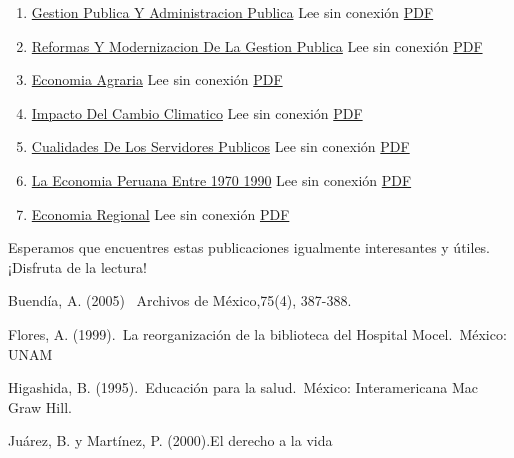 \documentclass[
  jou,
  floatsintext,
  longtable,
  a4paper,
  nolmodern,
  notxfonts,
  notimes,
  colorlinks=true,linkcolor=blue,citecolor=blue,urlcolor=blue]{apa7}
\begin{document}
\begin{enumerate}
{  De Blogdown} Lee sin conexión
  \href{https://achalmaedison.netlify.app/blog/posts/2021-07-14-comandos-de-blogdown/index.pdf}{PDF}
\item
  \href{https://achalmaedison.netlify.app/blog/posts/2021-10-01-gestion-publica-y-administracion-publica}{Gestion
  Publica Y Administracion Publica} Lee sin conexión
  \href{https://achalmaedison.netlify.app/blog/posts/2021-10-01-gestion-publica-y-administracion-publica/index.pdf}{PDF}
\item
  \href{https://achalmaedison.netlify.app/blog/posts/2021-10-01-reformas-y-modernizacion-de-la-gestion-publica}{Reformas
  Y Modernizacion De La Gestion Publica} Lee sin conexión
  \href{https://achalmaedison.netlify.app/blog/posts/2021-10-01-reformas-y-modernizacion-de-la-gestion-publica/index.pdf}{PDF}
\item
  \href{https://achalmaedison.netlify.app/blog/posts/2022-04-22-economia-agraria}{Economia
  Agraria} Lee sin conexión
  \href{https://achalmaedison.netlify.app/blog/posts/2022-04-22-economia-agraria/index.pdf}{PDF}
\item
  \href{https://achalmaedison.netlify.app/blog/posts/2022-06-02-impacto-del-cambio-climatico}{Impacto
  Del Cambio Climatico} Lee sin conexión
  \href{https://achalmaedison.netlify.app/blog/posts/2022-06-02-impacto-del-cambio-climatico/index.pdf}{PDF}
\item
  \href{https://achalmaedison.netlify.app/blog/posts/2023-05-11-cualidades-de-los-servidores-publicos}{Cualidades
  De Los Servidores Publicos} Lee sin conexión
  \href{https://achalmaedison.netlify.app/blog/posts/2023-05-11-cualidades-de-los-servidores-publicos/index.pdf}{PDF}
\item
  \href{https://achalmaedison.netlify.app/blog/posts/2023-05-12-la-economia-peruana-entre-1970-1990}{La
  Economia Peruana Entre 1970 1990} Lee sin conexión
  \href{https://achalmaedison.netlify.app/blog/posts/2023-05-12-la-economia-peruana-entre-1970-1990/index.pdf}{PDF}
\item
  \href{https://achalmaedison.netlify.app/blog/posts/2023-05-16-economia-regional}{Economia
  Regional} Lee sin conexión
  \href{https://achalmaedison.netlify.app/blog/posts/2023-05-16-economia-regional/index.pdf}{PDF}
\end{enumerate}

Esperamos que encuentres estas publicaciones igualmente interesantes y
útiles. ¡Disfruta de la lectura!

Buendía, A. (2005) ~Archivos de México,75(4), 387-388.

Flores, A. (1999).~La reorganización de la biblioteca del Hospital
Mocel.~México: UNAM

Higashida, B. (1995).~Educación para la salud.~México: Interamericana
Mac Graw Hill.

Juárez, B. y Martínez, P. (2000).El derecho a la vida
\end{document}
